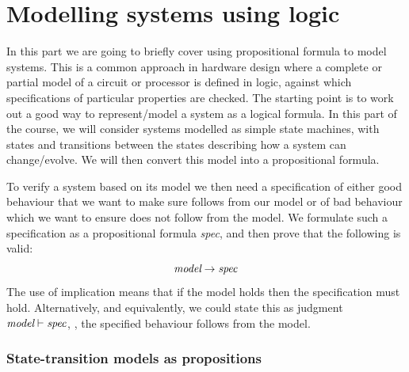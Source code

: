 \part{Modelling systems using logic}
\setcounter{section}{0}

\newcommand{\atomr}{\textsf{r}}
\newcommand{\atomrp}{\textsf{r'}}
\newcommand{\atomg}{\textsf{g}}
\newcommand{\atomgp}{\textsf{g'}}

In this part we are going to briefly cover using propositional
formula to model systems. This is a common approach in hardware design
where a complete or partial model of a circuit or processor is defined in logic,
against which specifications of particular properties are checked.
The starting point is to work out a good way to represent/model a
system as a logical formula. In this part of the course, we will
consider systems modelled as simple state machines, with states and
transitions between the states describing how a system can
change/evolve. We will then convert this model into a propositional
formula.


To verify a system based on its model we then need a specification of
either good behaviour that we want to make sure follows from our model
or of bad behaviour which we want to ensure does not follow from the
model.  We formulate such a specification as a propositional formula
\emph{spec}, and then prove that the following is valid:
%
\begin{equation*}
\emph{model} \rightarrow \emph{spec}
\end{equation*}
%
The use of implication means that if the model holds then
the specification must hold. Alternatively, and equivalently,
we could state this as judgment $\emph{model} \vdash \emph{spec}$,
\ie{}, the specified behaviour follows from the model.

\section{State-transition models as propositions}

